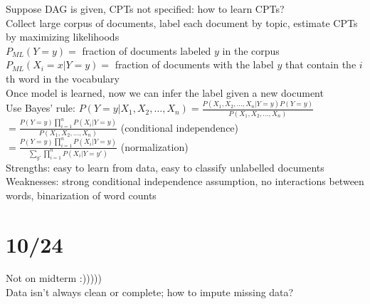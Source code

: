 \documentclass[10pt,letterpaper,unboxed,cm]{article}
\begin{document}
Suppose DAG is given, CPTs not specified: how to learn CPTs?\\
Collect large corpus of documents, label each document by topic, estimate CPTs by maximizing likelihoods\\
$P_{ML}(Y = y) = $ fraction of documents labeled $y$ in the corpus\\
$P_{ML}(X_i = x|Y = y) = $ fraction of documents with the label $y$ that contain the $i$th word in the vocabulary\\
Once model is learned, now we can infer the label given a new document\\
Use Bayes' rule: $P(Y = y|X_1, X_2, \ldots, X_n) = \frac{P(X_1, X_2, \ldots, X_n|Y = y)P(Y = y)}{P(X_1, X_2, \ldots, X_n)}$\\
$ = \frac{P(Y = y)\prod^n_{i=1} P(X_i|Y = y)}{P(X_1, X_2, \ldots, X_n)}$ (conditional independence)\\
$ = \frac{P(Y = y)\prod^n_{i=1} P(X_i|Y = y)}{\sum_{y'} \prod^n_{i=1} P(X_i|Y=y')}$ (normalization)\\
Strengths: easy to learn from data, easy to classify unlabelled documents\\
Weaknesses: strong conditional independence assumption, no interactions between words, binarization of word counts\\
\section{10/24} 
Not on midterm :)))))\\
Data isn't always clean or complete; how to impute missing data?\\
\end{document}
